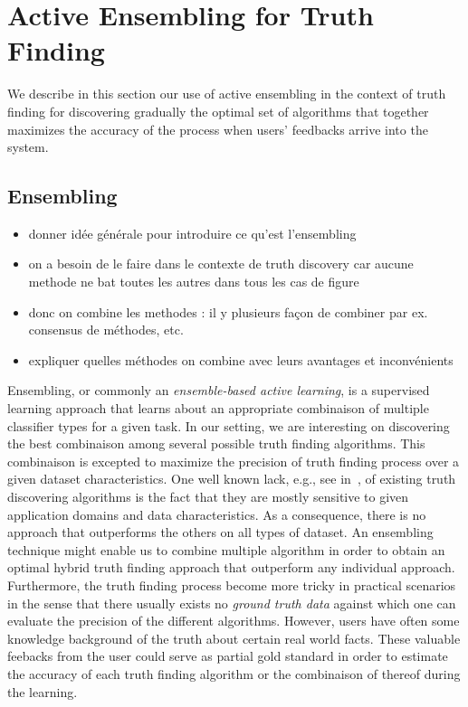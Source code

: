 \section{Active Ensembling for Truth Finding}
We describe in this section our use of active ensembling in the context of truth finding
for discovering gradually the optimal set of algorithms that together maximizes the accuracy
of the process when users' feedbacks arrive into the system.

\subsection{Ensembling }
\begin{itemize}
\item donner idée générale pour introduire  ce qu'est l'ensembling
\item on a besoin de le faire dans le contexte de truth discovery car aucune methode ne bat toutes les autres dans tous les cas de figure
\item donc on combine les methodes : il y plusieurs façon de combiner par ex. consensus de méthodes, etc.
\item expliquer quelles méthodes on combine avec leurs avantages et inconvénients
\end{itemize}


Ensembling, or commonly an \emph{ensemble-based active learning}, is a supervised learning approach that learns
about an appropriate combinaison of multiple classifier types for a given task. In our setting, we are interesting
on discovering the best combinaison among several possible truth finding algorithms. This combinaison is excepted 
to maximize the precision of truth finding process over a given dataset characteristics.
One well known lack, e.g., see in~\cite{Li12, Wagui14}, of existing truth discovering algorithms is the fact that
they are mostly sensitive to given application domains and data characteristics. As a consequence, there is no approach 
that outperforms the others on all types of dataset.  An ensembling technique might enable  us to combine multiple algorithm
in order to obtain an optimal hybrid truth finding approach that outperform any individual approach. Furthermore, the truth
finding process become more tricky in practical scenarios in the sense that there usually exists no \emph{ground truth data}
against which one can evaluate the precision of the different algorithms. However, users have often some knowledge background
of the truth about certain real world facts. These valuable feebacks from the user could serve as partial gold standard in order
to estimate the accuracy of each truth finding algorithm or the combinaison of thereof during the learning.



